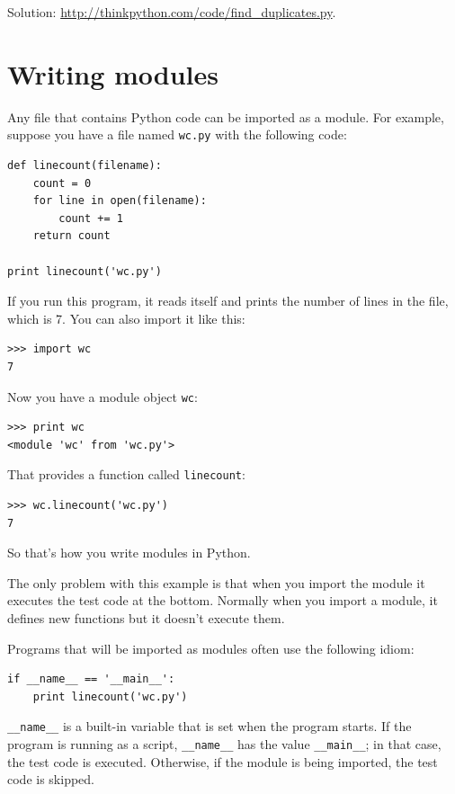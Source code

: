 \documentclass[10pt]{book}
\begin{document}
\begin{CJK}{UTF8}{gbsn}
\begin{exercise}
\begin{enumerate}
\end{enumerate}

Solution: \url{http://thinkpython.com/code/find_duplicates.py}.

\end{exercise}


\section{Writing modules}
\label{modules}

Any file that contains Python code can be imported as a module.
For example, suppose you have a file named {\tt wc.py} with the following
code:

\begin{verbatim}
def linecount(filename):
    count = 0
    for line in open(filename):
        count += 1
    return count

print linecount('wc.py')
\end{verbatim}
%
If you run this program, it reads itself and prints the number
of lines in the file, which is 7.
You can also import it like this:

\begin{verbatim}
>>> import wc
7
\end{verbatim}
%
Now you have a module object {\tt wc}:

\begin{verbatim}
>>> print wc
<module 'wc' from 'wc.py'>
\end{verbatim}
%
That provides a function called \verb"linecount":

\begin{verbatim}
>>> wc.linecount('wc.py')
7
\end{verbatim}
%
So that's how you write modules in Python.

The only problem with this example is that when you import
the module it executes the test code at the bottom.  Normally
when you import a module, it defines new functions but it
doesn't execute them.

Programs that will be imported as modules often
use the following idiom:

\begin{verbatim}
if __name__ == '__main__':
    print linecount('wc.py')
\end{verbatim}
%
\verb"__name__" is a built-in variable that is set when the
program starts.  If the program is running as a script,
\verb"__name__" has the value \verb"__main__"; in that
case, the test code is executed.  Otherwise,
if the module is being imported, the test code is skipped.


\end{CJK}
\end{document}
